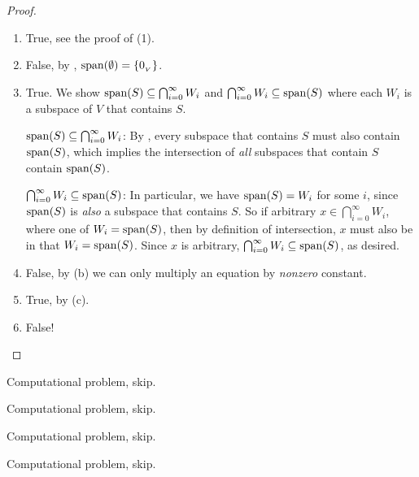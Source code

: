 \begin{proof}\ 

\begin{enumerate}
\item True, see the proof of (1).
\item False, by , \(\operatorname{span}(\emptyset) = \{ 0_{_V} \}\).
\item True.
      We show \(\operatorname{span}(S) \subseteq \bigcap_{i = 0}^{\infty} W_i\) and \(\bigcap_{i = 0}^{\infty} W_i \subseteq \operatorname{span}(S)\) where each \(W_i\) is a subspace of \(V\) that contains \(S\).
      
      \(\operatorname{span}(S) \subseteq \bigcap_{i = 0}^{\infty} W_i\): By , every subspace that contains \(S\) must also contain \(\operatorname{span}(S)\), which implies the intersection of \emph{all} subspaces that contain \(S\) contain \(\operatorname{span}(S)\).
      
      \(\bigcap_{i = 0}^{\infty} W_i \subseteq \operatorname{span}(S)\):
      In particular, we have \(\operatorname{span}(S) = W_i\) for some \(i\), since \(\operatorname{span}(S)\) is \emph{also} a subspace that contains \(S\).
      So if arbitrary \(x \in \bigcap_{i = 0}^{\infty} W_i\), where one of \(W_i = \operatorname{span}(S)\), then by definition of intersection, \(x\) must also be in that \(W_i = \operatorname{span}(S)\).
      Since \(x\) is arbitrary, \(\bigcap_{i = 0}^{\infty} W_i \subseteq \operatorname{span}(S)\), as desired.
\item False, by (b) we can only multiply an equation by \emph{nonzero} constant.
\item True, by (c).
\item False!
\end{enumerate}
\end{proof}

\begin{exercise} \label{exercise 1.4.2}
Computational problem, skip.
\end{exercise}

\begin{exercise} \label{exercise 1.4.3}
Computational problem, skip.
\end{exercise}

\begin{exercise} \label{exercise 1.4.4}
Computational problem, skip.
\end{exercise}

\begin{exercise} \label{exercise 1.4.5}
Computational problem, skip.
\end{exercise}

